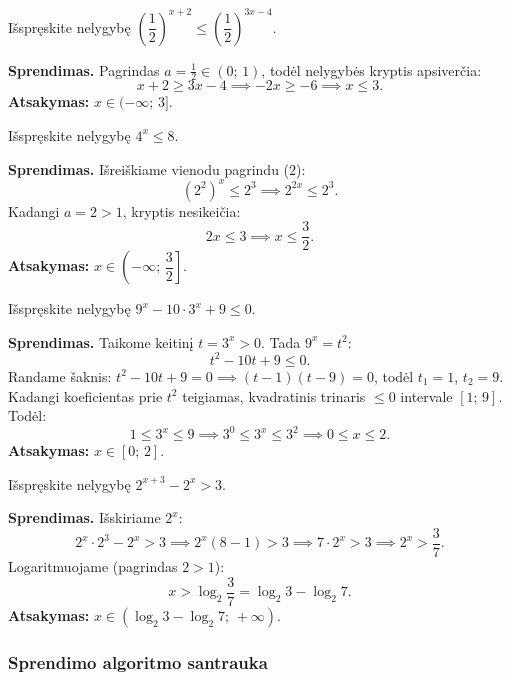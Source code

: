 \begin{example}
Išspręskite nelygybę $\left(\dfrac{1}{2}\right)^{x+2} \leq \left(\dfrac{1}{2}\right)^{3x-4}$.

\textbf{Sprendimas.} Pagrindas $a = \tfrac{1}{2} \in (0;\, 1)$, todėl nelygybės kryptis apsiverčia:
\[
    x + 2 \geq 3x - 4 \implies -2x \geq -6 \implies x \leq 3.
\]
\textbf{Atsakymas:} $x \in (-\infty;\, 3]$.
\end{example}

\begin{example}
Išspręskite nelygybę $4^{x} \leq 8$.

\textbf{Sprendimas.} Išreiškiame vienodu pagrindu ($2$):
\[
    (2^2)^x \leq 2^3 \implies 2^{2x} \leq 2^3.
\]
Kadangi $a = 2 > 1$, kryptis nesikeičia:
\[
    2x \leq 3 \implies x \leq \frac{3}{2}.
\]
\textbf{Atsakymas:} $x \in \left(-\infty;\, \dfrac{3}{2}\right]$.
\end{example}

\begin{example}
Išspręskite nelygybę $9^x - 10 \cdot 3^x + 9 \leq 0$.

\textbf{Sprendimas.} Taikome keitinį $t = 3^x > 0$. Tada $9^x = t^2$:
\[
    t^2 - 10t + 9 \leq 0.
\]
Randame šaknis: $t^2 - 10t + 9 = 0 \implies (t-1)(t-9) = 0$, todėl $t_1 = 1$, $t_2 = 9$.\\
Kadangi koeficientas prie $t^2$ teigiamas, kvadratinis trinaris $\leq 0$ intervale $[1;\, 9]$.\\
Todėl:
\[
    1 \leq 3^x \leq 9 \implies 3^0 \leq 3^x \leq 3^2 \implies 0 \leq x \leq 2.
\]
\textbf{Atsakymas:} $x \in [0;\, 2]$.
\end{example}

\begin{example}
Išspręskite nelygybę $2^{x+3} - 2^x > 3$.

\textbf{Sprendimas.} Išskiriame $2^x$:
\[
    2^x \cdot 2^3 - 2^x > 3 \implies 2^x(8 - 1) > 3 \implies 7 \cdot 2^x > 3
    \implies 2^x > \frac{3}{7}.
\]
Logaritmuojame (pagrindas $2 > 1$):
\[
    x > \log_2\frac{3}{7} = \log_2 3 - \log_2 7.
\]
\textbf{Atsakymas:} $x \in \left(\log_2 3 - \log_2 7;\, +\infty\right)$.
\end{example}

\subsubsection*{Sprendimo algoritmo santrauka}

